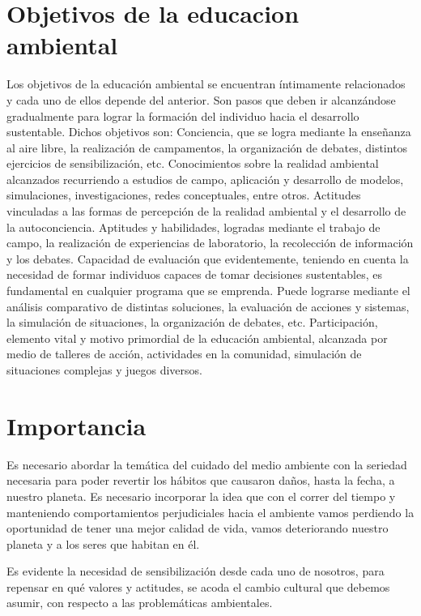 \documentclass{bmcart}
\begin{document}
	\section*{Objetivos de la educacion ambiental}
	Los objetivos de la educación ambiental se encuentran íntimamente relacionados y cada uno de ellos depende del anterior. Son pasos que deben ir alcanzándose gradualmente para lograr la formación del individuo hacia el desarrollo sustentable. Dichos objetivos son:
	Conciencia, que se logra mediante la enseñanza al aire libre, la realización de campamentos, la organización de debates, distintos ejercicios de sensibilización, etc.
	Conocimientos sobre la realidad ambiental alcanzados recurriendo a estudios de campo, aplicación y desarrollo de modelos, simulaciones, investigaciones, redes conceptuales, entre otros.
	Actitudes vinculadas a las formas de percepción de la realidad ambiental y el desarrollo de la autoconciencia.
	Aptitudes y habilidades, logradas mediante el trabajo de campo, la realización de experiencias de laboratorio, la recolección de información y los debates.
	Capacidad de evaluación que evidentemente, teniendo en cuenta la necesidad de formar individuos capaces de tomar decisiones sustentables, es fundamental en cualquier programa que se emprenda. Puede lograrse mediante el análisis comparativo de distintas soluciones, la evaluación de acciones y sistemas, la simulación de situaciones, la organización de debates, etc.
	Participación, elemento vital y motivo primordial de la educación ambiental, alcanzada por medio de talleres de acción, actividades en la comunidad, simulación de situaciones complejas y juegos diversos.\\
	
	\section*{Importancia}
	Es necesario abordar la temática del cuidado del medio ambiente con la seriedad necesaria para poder revertir los hábitos que causaron daños, hasta la fecha, a nuestro planeta. Es necesario incorporar la idea que con el correr del tiempo y manteniendo comportamientos perjudiciales hacia el ambiente vamos perdiendo la oportunidad de tener una mejor calidad de vida, vamos deteriorando nuestro planeta y a los seres que habitan en él.
	
	Es evidente la necesidad de sensibilización desde cada uno de nosotros, para repensar en qué valores y actitudes, se acoda el cambio cultural que debemos asumir, con respecto a las problemáticas ambientales.
	
\end{document}
